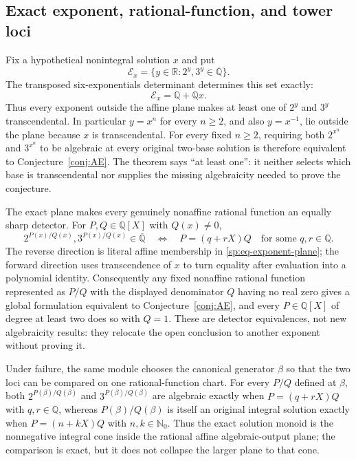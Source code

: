 \documentclass[11pt,oneside]{article}
\theoremstyle{definition}
\theoremstyle{remark}
\newcommand{\Nzero}{\mathbb N_0}
\newcommand{\Q}{\mathbb Q}
\newcommand{\R}{\mathbb R}
\newcommand{\Abar}{\overline{\mathbb Q}}
\newcommand{\Qbar}{\Abar}
\begin{document}
\subsection{Exact exponent, rational-function, and tower loci}
\label{sec:exact-exponent-loci}

Fix a hypothetical nonintegral solution $x$ and put
\[
 \mathcal E_x=\{y\in\R:2^y,3^y\in\Qbar\}.
\]
The transposed six-exponentials determinant determines this set exactly:
\begin{equation}
 \mathcal E_x=\Q+\Q x.
 \label{sp:eq-exponent-plane}
\end{equation}
Thus every exponent outside the affine plane makes at least one of $2^y$ and $3^y$
transcendental.  In particular $y=x^n$ for every $n\ge2$, and also $y=x^{-1}$, lie outside
the plane because $x$ is transcendental.  For every fixed $n\ge2$, requiring both
$2^{x^n}$ and $3^{x^n}$ to be algebraic at every original two-base solution is therefore
equivalent to Conjecture~\ref{conj:AE}.  The theorem says ``at least one'': it neither selects
which base is transcendental nor supplies the missing algebraicity needed to prove the
conjecture.

The exact plane makes every genuinely nonaffine rational function an equally sharp detector.
For $P,Q\in\Q[X]$ with $Q(x)\ne0$,
\begin{equation}
 2^{P(x)/Q(x)},3^{P(x)/Q(x)}\in\Qbar
 \quad\Longleftrightarrow\quad
 P=(q+rX)Q\quad\text{for some }q,r\in\Q.
 \label{sp:eq-rational-function-locus}
\end{equation}
The reverse direction is literal affine membership in \eqref{sp:eq-exponent-plane}; the
forward direction uses transcendence of $x$ to turn equality after evaluation into a
polynomial identity.  Consequently any fixed nonaffine rational function represented as
$P/Q$ with the displayed denominator $Q$ having no real zero gives a global formulation
equivalent to Conjecture~\ref{conj:AE}, and every
$P\in\Q[X]$ of degree at least two does so with $Q=1$.  These are detector equivalences, not
new algebraicity results: they relocate the open conclusion to another exponent without
proving it.

Under failure, the same module chooses the canonical generator $\beta$ so that the two loci
can be compared on one rational-function chart.  For every $P/Q$ defined at $\beta$, both
$2^{P(\beta)/Q(\beta)}$ and $3^{P(\beta)/Q(\beta)}$ are algebraic exactly when
$P=(q+rX)Q$ with $q,r\in\Q$, whereas $P(\beta)/Q(\beta)$ is itself an original integral
solution exactly when $P=(n+kX)Q$ with $n,k\in\Nzero$.  Thus the exact solution monoid is the
nonnegative integral cone inside the rational affine algebraic-output plane; the comparison
is exact, but it does not collapse the larger plane to that cone.
\end{document}
